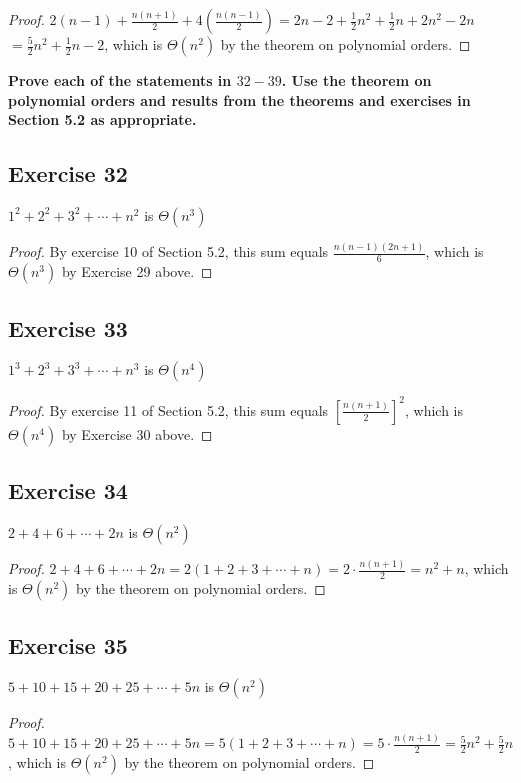 \documentclass[14pt]{extarticle}
\newcommand{\dps}{\displaystyle}
\newcommand{\cy}{\color{cyan}}
\begin{document}
\begin{proof}
    \(\dps 2(n-1) + \frac{n(n+1)}{2} + 4\left(\frac{n(n-1)}{2}\right) = 2n - 2 + \frac{1}{2}n^2 + \frac{1}{2}n + 2n^2 - 2n\)
    \( = \frac{5}{2}n^2 + \frac{1}{2}n - 2\),  which is \(\Theta(n^2)\) by the theorem on polynomial orders.
\end{proof}

{\bf \cy Prove each of the statements in \(32-39\). Use the theorem on polynomial orders and results from the theorems and
exercises in Section 5.2 as appropriate.}

\subsection{Exercise 32}
\(1^2 + 2^2 + 3^2 + \cdots + n^2\) is \(\Theta(n^3)\)

\begin{proof}
    By exercise 10 of Section 5.2, this sum equals \(\dps \frac{n(n-1)(2n+1)}{6}\), which is \(\Theta(n^3)\) by Exercise
    29 above.
\end{proof}

\subsection{Exercise 33}
\(1^3 + 2^3 + 3^3 + \cdots + n^3\) is \(\Theta(n^4)\)

\begin{proof}
    By exercise 11 of Section 5.2, this sum equals \(\dps \left[\frac{n(n+1)}{2}\right]^2\), which is \(\Theta(n^4)\) by Exercise 30 above.
\end{proof}

\subsection{Exercise 34}
\(2 + 4 + 6 + \cdots + 2n\) is \(\Theta(n^2)\)

\begin{proof}
    \(2 + 4 + 6 + \cdots + 2n = 2(1+2+3+ \cdots + n) = 2 \cdot \frac{n(n+1)}{2} = n^2+n\),  which is \(\Theta(n^2)\) by the
    theorem on polynomial orders.
\end{proof}

\subsection{Exercise 35}
\(5 + 10 + 15 + 20 + 25 + \cdots + 5n\) is \(\Theta(n^2)\)

\begin{proof}
    \(5 + 10 + 15 + 20 + 25 + \cdots + 5n = 5(1+2+3+ \cdots + n) = 5 \cdot \frac{n(n+1)}{2} = \frac{5}{2}n^2 + \frac{5}{2}n\),
    which is \(\Theta(n^2)\) by the theorem on polynomial orders.
\end{proof}
\end{document}
